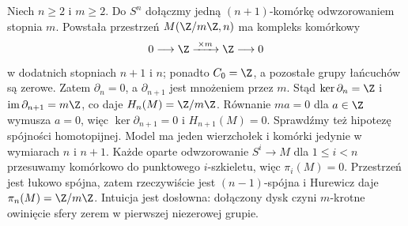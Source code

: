 \begin{przyklad}
\label{prz:moore-hurewicz}
Niech $n\geq2$ i $m\geq2$.
Do $S^n$ dołączmy
jedną $(n+1)$-komórkę
odwzorowaniem stopnia $m$.
Powstała przestrzeń
$M(\Z/m\Z,n)$ ma
kompleks komórkowy
\[
 0\longrightarrow\Z
 \xrightarrow{\;\times m\;}\Z
 \longrightarrow0
\]
w dodatnich stopniach $n+1$ i $n$; ponadto $C_0=\Z$,
a pozostałe grupy łańcuchów są zerowe. Zatem
$\partial_n=0$, a $\partial_{n+1}$ jest mnożeniem przez $m$.
Stąd $\ker\partial_n=\Z$ i $\operatorname{im}\partial_{n+1}=m\Z$,
co daje $H_n(M)=\Z/m\Z$.
Równanie $m a=0$ dla $a\in\Z$ wymusza $a=0$,
więc $\ker\partial_{n+1}=0$ i $H_{n+1}(M)=0$.
Sprawdźmy też hipotezę spójności homotopijnej.
Model ma jeden wierzchołek i komórki jedynie w wymiarach $n$ i $n+1$.
Każde oparte odwzorowanie $S^i\to M$ dla $1\leq i<n$
przesuwamy komórkowo do punktowego $i$-szkieletu, więc
$\pi_i(M)=0$. Przestrzeń jest łukowo spójna, zatem rzeczywiście
jest $(n-1)$-spójna i Hurewicz daje $\pi_n(M)=\Z/m\Z$.
Intuicja jest
dosłowna: dołączony
dysk czyni
$m$-krotne
owinięcie sfery
zerem w pierwszej
niezerowej grupie.
\end{przyklad}

